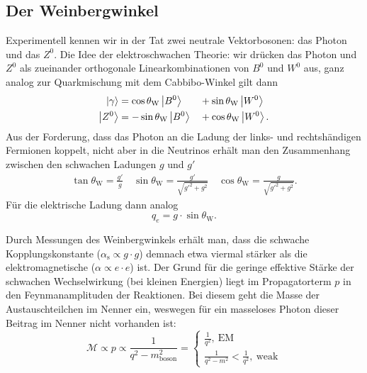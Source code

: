 \subsection{Der Weinbergwinkel}
Experimentell kennen wir in der Tat zwei neutrale Vektorbosonen: das Photon und das $Z^0$.
Die Idee der elektroschwachen Theorie: wir drücken das Photon und $Z^0$ als zueinander orthogonale Linearkombinationen von $B^0$ und $W^0$ aus,
ganz analog zur Quarkmischung mit dem Cabbibo-Winkel gilt dann
\begin{alignat*}{3}
	\ket{\gamma} &= \cos\theta_\text{W}\ket{B^0} &&+ \sin\theta_\text{W}\ket{W^0} \\
	\ket{Z^0} &= -\sin\theta_\text{W}\ket{B^0} &&+ \cos\theta_\text{W}\ket{W^0}.
\end{alignat*}
Aus der Forderung, dass das Photon an die Ladung der links- und rechtshändigen Fermionen koppelt, nicht aber in die Neutrinos erhält man den Zusammenhang zwischen den schwachen Ladungen $g$ und $g'$
\begin{gather*}
	\tan\theta_\text{W} = \frac{g'}{g}\quad\sin\theta_\text{W}=\frac{g'}{\sqrt{g'^2 + g^2}}\quad\cos\theta_\text{W}=\frac{g}{\sqrt{g'^2 + g^2}}.
\end{gather*}
Für die elektrische Ladung dann analog
\begin{equation*}
	q_e = g\cdot\sin\theta_\text{W}.
\end{equation*}

Durch Messungen des Weinbergwinkels erhält man, dass die schwache Kopplungskonstante ($\alpha_\text{s}\propto g\cdot g$) demnach etwa viermal stärker als die elektromagnetische ($\alpha\propto e\cdot e$) ist.
Der Grund für die geringe effektive Stärke der schwachen Wechselwirkung (bei kleinen Energien) liegt im Propagatorterm $p$ in den Feynmanamplituden der Reaktionen.
Bei diesem geht die Masse der Austauschteilchen im Nenner ein, weswegen für ein masseloses Photon dieser Beitrag im Nenner nicht vorhanden ist:
\begin{equation*}
	\mathcal{M}\propto p\propto \frac{1}{q^2 - m^2_\text{boson}} =
	\begin{cases}
		\frac{1}{q^2},\ \text{EM} \\
		\frac{1}{q^2 - m^2}<\frac{1}{q^2},\ \text{weak}
	\end{cases}
\end{equation*}
